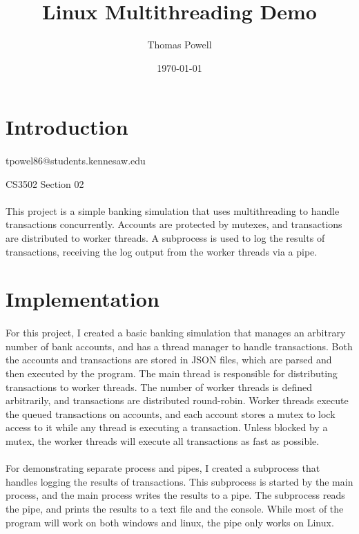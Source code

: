 \documentclass[12pt]{article}
\title{Linux Multithreading Demo}
\author{Thomas Powell}
\date{\today}
\begin{document}
\maketitle
\pagebreak
\section{Introduction}

\paragraph{}
tpowel86@students.kennesaw.edu

CS3502 Section 02

\paragraph{}
This project is a simple banking simulation that uses multithreading to handle transactions concurrently.
Accounts are protected by mutexes, and transactions are distributed to worker threads.
A subprocess is used to log the results of transactions, receiving the log output from the worker threads via a pipe.

\section{Implementation}

\paragraph{}
For this project, I created a basic banking simulation that manages an arbitrary number of bank accounts, and has a thread manager to handle transactions.
Both the accounts and transactions are stored in JSON files, which are parsed and then executed by the program.
The main thread is responsible for distributing transactions to worker threads. 
The number of worker threads is defined arbitrarily, and transactions are distributed round-robin.
Worker threads execute the queued transactions on accounts, and each account stores a mutex to lock access to it while any thread is executing a transaction.
Unless blocked by a mutex, the worker threads will execute all transactions as fast as possible.

\paragraph{}
For demonstrating separate process and pipes, I created a subprocess that handles logging the results of transactions.
This subprocess is started by the main process, and the main process writes the results to a pipe.
The subprocess reads the pipe, and prints the results to a text file and the console.
While most of the program will work on both windows and linux, the pipe only works on Linux.
\end{document}
